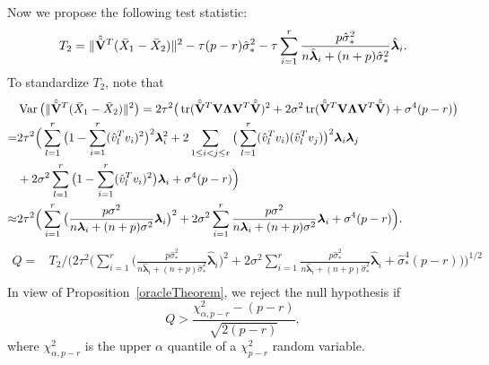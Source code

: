 \documentclass[review]{elsarticle}
\DeclareMathOperator{\mytr}{tr}
\DeclareMathOperator{\myVar}{Var}
\newcommand{\bfsym}[1]{\ensuremath{\boldsymbol{#1}}}
\def\blambda {\bfsym {\lambda}}        \def\bLambda {\bfsym {\Lambda}}
\theoremstyle{plain}
\theoremstyle{definition}
\theoremstyle{remark}
\begin{document}

Now we propose the following test statistic:
$$
T_2=
\|\hat{\tilde{\BV}}^T (\bar{X}_1-\bar{X}_2)\|^2
-
\tau(p-r)\hat{\sigma}_*^2 
- \tau\sum_{i=1}^r \frac{p\hat{\sigma}_*^2}{n\hat{\blambda}_i+(n+p)\hat{\sigma}_*^2}\hat{\blambda}_i.
$$
To standardize $T_2$, note that
$$
\begin{aligned}
    &\myVar\big(
\|\hat{\tilde{\BV}}^T (\bar{X}_1-\bar{X}_2)\|^2
\big)
    =2\tau^2\big(
\mytr(\hat{\tilde{\BV}}^T \BV \bLambda \BV^T\hat{\tilde{\BV}})^2
+
2\sigma^2\mytr(\hat{\tilde{\BV}}^T \BV \bLambda \BV^T\hat{\tilde{\BV}})
+\sigma^4 (p-r)
\big)
\\
    =&
    2\tau^2\Big(
    \sum_{l=1}^r \big(1-\sum_{i=1}^r (\hat{v}_l^T v_i)^2\big)^2 \blambda_i^2
    +2\sum_{1\leq i<j \leq r}\big(\sum_{l=1}^r (\hat{v}_l^T v_i)(\hat{v}_l^T v_j )\big)^2\blambda_i\blambda_j
    \\
    &+
    2\sigma^2\sum_{l=1}^r \big(1-\sum_{i=1}^r (\hat{v}_l^T v_i)^2\big) \blambda_i
    +\sigma^4 (p-r)
    \Big)
    \\
    \approx&
    2\tau^2\Big(
    \sum_{i=1}^r \big(\frac{p\sigma^2}{n\blambda_i+(n+p)\sigma^2}\blambda_i\big)^2
    +
    2\sigma^2\sum_{i=1}^r \frac{p\sigma^2}{n\blambda_i+(n+p)\sigma^2}\blambda_i
    +\sigma^4 (p-r)
    \Big).
\end{aligned}
$$
$$
    \begin{aligned}
        Q=&T_2/
   \Bigg( 
        2\tau^2\Big(
        \sum_{i=1}^r \big(\frac{p\hat{\sigma}_*^2}{n\hat{\blambda}_i+(n+p)\hat{\sigma}_*^2}\hat{\blambda}_i\big)^2
    +
        2\sigma^2\sum_{i=1}^r \frac{p\hat{\sigma}_*^2}{n\hat{\blambda}_i+(n+p)\hat{\sigma}_*^2}\hat{\blambda}_i
        +\hat{\sigma}_*^4 (p-r)
    \Big)\Bigg)^{1/2}\\
    \end{aligned}
$$
In view of Proposition~\ref{oracleTheorem}, we reject the null hypothesis if
$$
        Q>\frac{\chi^2_{\alpha, p-r}-(p-r)}{\sqrt{2(p-r)}},
$$
where $\chi^2_{\alpha, p-r}$ is the upper $\alpha$ quantile of a $\chi^2_{p-r}$ random variable.
\end{document}
